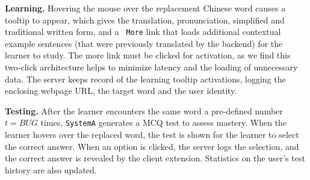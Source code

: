 
{\bf Learning.} Hovering the mouse over the replacement Chinese word
causes a tooltip to appear, which gives the translation,
pronunciation, simplified and traditional written form, and a {\tt
  More} link that loads additional contextual example sentences (that
were previously translated by the backend) for the learner to study.
The more link must be clicked for activation, as we find this
two-click architecture helps to minimize latency and the loading of
unnecessary data.  The server keeps record of the learning tooltip
activations, logging the enclosing webpage URL, the target word and
the user identity.


{\bf Testing.}  After the learner encounters the same word a
pre-defined number $t=BUG$ times, {\tt SystemA} generates a MCQ test
to assess mastery.  When the learner hovers over the replaced word,
the test is shown for the learner to select the correct answer. When
an option is clicked, the server logs the selection, and the correct
answer is revealed by the client extension.  Statistics on the user's
test history are also updated.

